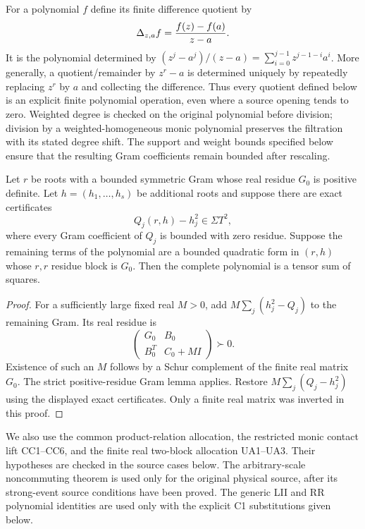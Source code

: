 For a polynomial $f$ define its finite difference quotient by
\[
 \Delta_{z,a}f={f(z)-f(a)\over z-a}.
\]
It is the polynomial determined by
$(z^j-a^j)/(z-a)=\sum_{i=0}^{j-1}z^{j-1-i}a^i$.
More generally, a quotient/remainder by $z^r-a$ is determined uniquely
by repeatedly replacing $z^r$ by $a$ and collecting the difference.
Thus every quotient defined below is an explicit finite polynomial
operation, even where a source opening tends to zero. Weighted degree
is checked on the original polynomial before division; division by
a weighted-homogeneous monic polynomial preserves the filtration
with its stated degree shift. The support and weight bounds specified below ensure that the resulting
Gram coefficients remain bounded after rescaling.

\begin{lemma}
\label{lem:c1-square-allocation}
Let $r$ be roots with a bounded symmetric Gram whose real residue
$G_0$ is positive definite. Let $h=(h_1,\ldots,h_s)$ be additional
roots and suppose there are exact certificates
\[
 Q_j(r,h)-h_j^2\in\Sigma T^2,
\]
where every Gram coefficient of $Q_j$ is bounded with zero residue.
Suppose the remaining terms of the polynomial are a bounded quadratic
form in $(r,h)$ whose $r,r$ residue block is $G_0$. Then the complete
polynomial is a tensor sum of squares.
\end{lemma}
\begin{proof}
For a sufficiently large fixed real $M>0$, add
$M\sum_j(h_j^2-Q_j)$ to the remaining Gram. Its real residue is
\[
 \begin{pmatrix}G_0&B_0\\B_0^T&C_0+MI\end{pmatrix}\succ0.
\]
Existence of such an $M$ follows by a Schur complement of the finite
real matrix $G_0$. The strict positive-residue Gram lemma applies.
Restore $M\sum_j(Q_j-h_j^2)$ using the displayed exact certificates.
Only a finite real matrix was inverted in this proof.
\end{proof}

We also use the common product-relation allocation, the restricted
monic contact lift CC1--CC6, and the finite real two-block allocation
UA1--UA3. Their hypotheses are checked in the source cases below.
The arbitrary-scale noncommuting theorem is used only for the original
physical source, after its strong-event source conditions have been
proved. The generic LII and RR polynomial identities are used only
with the explicit C1 substitutions given below.

